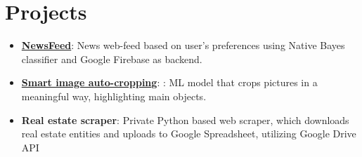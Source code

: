 \documentclass[letterpaper,11pt]{article}
\newcommand{\resumeItem}[2]{
  \item\small{
    \textbf{#1}{: #2 \vspace{-2pt}}
  }
}
\newcommand{\resumeSubItem}[2]{\resumeItem{#1}{#2}\vspace{-4pt}}
\newcommand{\resumeSubHeadingListStart}{\begin{itemize}[leftmargin=*]}
\newcommand{\resumeSubHeadingListEnd}{\end{itemize}}
\begin{document}
\section{Projects}
  \resumeSubHeadingListStart
    \resumeSubItem{\href{https://docs.google.com/presentation/d/1Gv3vdJE86mvOIxnW-pk3Q2gU45SUCmGokDSGqtKwirs/edit?usp=sharing}{NewsFeed}}
      {News web-feed based on user's preferences using Native Bayes classifier and Google Firebase as backend. }
    \resumeSubItem{\href{https://community.wolfram.com/groups/-/m/t/1379830}{Smart image auto-cropping}}: ML model that crops pictures in a meaningful way, highlighting main objects.
    \resumeSubItem{Real estate scraper}{Private Python based web scraper, which downloads real estate entities and uploads to Google Spreadsheet, utilizing Google Drive API}
  \resumeSubHeadingListEnd
\end{document}
